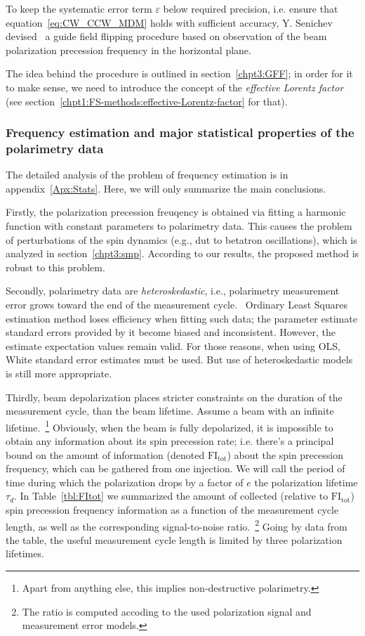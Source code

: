 To keep the systematic error term $\varepsilon$ below required precision, i.e. ensure
that equation~\eqref{eq:CW_CCW_MDM} holds with sufficient accuracy, Y. Senichev 
devised~\cite{Senichev:FDM} a guide field flipping procedure
based on observation of the beam polarization precession frequency in the horizontal plane.

The idea behind the procedure is outlined in section~\ref{chpt3:GFF}; in order for it to make sense, we need
to introduce the concept of the \emph{effective Lorentz factor}
(see section~\ref{chpt1:FS-methods:effective-Lorentz-factor} for that).

\subsubsection{Frequency estimation and major statistical properties of the polarimetry data}
The detailed analysis of the problem of frequency estimation is in appendix~\ref{Apx:Stats}. Here, we will
only summarize the main conclusions.

Firstly, the polarization precession freuqency is obtained via fitting a harmonic function with constant parameters to polarimetry data. This causes the problem of perturbations of the spin dynamics (e.g.,
dut to betatron oscillations), which is analyzed in section~\ref{chpt3:smp}. According to our results,
the proposed method is robust to this problem.

Secondly, polarimetry data are \emph{heteroskedastic}, i.e., polarimetry measurement error grows
toward the end of the measurement cycle.~\cite{Eversmann:Thesis} Ordinary Least Squares estimation method
loses efficiency when fitting such data; the parameter estimate standard errors provided by it
become biased and inconsistent. However, the estimate expectation values remain valid. For those reasons, when
using OLS, White standard error estimates must be used.
But use of heteroskedastic models~\cite{Stats:R:NLREG, Stats:HeteroskedasticNRM} is still more appropriate.

Thirdly, beam depolarization places stricter constraints on the duration of the measurement cycle, than
the beam lifetime. Assume a beam with an infinite lifetime.~\footnote{Apart from anything else,
  this implies non-destructive polarimetry.} Obviously, when the beam is fully depolarized, it is impossible to
obtain any information about its spin precession rate; i.e. there's a principal bound on the amount of information
(denoted $\mathrm{FI_{tot}}$) about the spin precession frequency, which can be gathered from one injection.
We will call the period of time during which the polarization drops by a factor of $e$
the polarization lifetime $\tau_d$. In Table~\ref{tbl:FItot} we summarized the amount of collected
(relative to $\mathrm{FI_{tot}}$) spin precession frequency information as a function of the measurement cycle
length, as well as the corresponding signal-to-noise ratio.~\footnote{The ratio is computed accoding to
  the used polarization signal and measurement error models.} Going by data from the table, the useful
measurement cycle length is limited by three polarization lifetimes.

